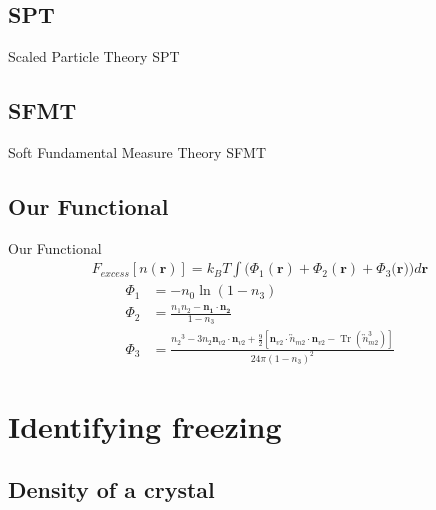 \documentclass{beamer}
\renewcommand{\vec}[1]{\mathbf{#1}}
\begin{document}
\subsection*{SPT}
\begin{frame}{Scaled Particle Theory}
  SPT
\end{frame}

\subsection*{SFMT}
\begin{frame}{Soft Fundamental Measure Theory}
  SFMT
\end{frame}

\subsection*{Our Functional}
\begin{frame}{Our Functional}
    \begin{align}\label{eq:Fexfunctional}
        F_{excess}[n(\vec{r})]=k_BT\int(\Phi_1(\vec{r})+\Phi_2(\vec{r})+\Phi_3(\vec{r}{)) d}\vec{r}
     \end{align}
     \begin{align}
         \Phi_1 &= -n_{0}\ln(1-n_{3}) \\
         \Phi_2 &= \frac{n_{1}n_{2}-\vec{n_{1}}\cdot\vec{n_{2}}}{1-n_{3}} \\
         \Phi_3 &= \frac{{n_2}^3-3n_2\vec{n}_{v2}\cdot\vec{n}_{v2}+\frac{9}{2}[\vec{n}_{v2}\cdot{\overleftrightarrow{n}_{m2}}\cdot{\vec{n}_{v2}}-\operatorname{Tr}({\overleftrightarrow{n}^3_{m2}})]}{24\pi(1-n_3)^2}  
      \end{align} 
\end{frame}

\section*{Identifying freezing}
\subsection*{Density of a crystal}
\end{document}
